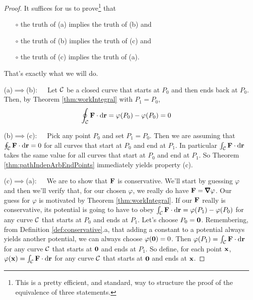 \begin{proof}
It suffices for us to prove\footnote{This is a pretty efficient, and 
standard, way to structure the proof of the equivalence of three 
statements.} that 
\begin{itemize}\itemsep1pt \parskip0pt  %
\item[$\circ$]
the truth of (a) implies the truth of (b) and
\item[$\circ$]
the truth of (b) implies the truth of (c) and
\item[$\circ$]
the truth of (c) implies the truth of (a).
\end{itemize}
That's exactly what we will do.

\noindent (a)$\implies$(b):\ \ \ 
Let $\mathcal{C}$ be a closed curve that starts at $P_0$ and then ends back at $P_0$.
Then, by Theorem \ref{thm:workIntegral} with $P_1=P_0$,
\begin{equation*}
\oint_{\mathcal{C}}\mathbf{F}\cdot\mathrm{d}\mathbf{r} =\varphi(P_0) - \varphi(P_0)=0
\end{equation*}

\noindent (b)$\implies$(c):\ \ \ 
Pick any point $P_0$ and set $P_1=P_0$. Then we are assuming that
$\oint_{\mathcal{C}}\mathbf{F}\cdot\mathrm{d}\mathbf{r}=0$ for all curves that start at $P_0$ and end at $P_1$.
In particular  $\int_{\mathcal{C}}\mathbf{F}\cdot\mathrm{d}\mathbf{r}$ takes the same value for all curves
that start at $P_0$ and end at $P_1$.
So Theorem \ref{thm:pathIndepArbEndPoints} immediately yields
property (c).

\medskip
\noindent (c)$\implies$(a):\ \ \ We are to show that $\mathbf{F}$ is conservative.
We'll start by guessing $\varphi$ and then we'll verify that, for our
chosen $\varphi$, we really do have $\vF=\vnabla\varphi$. Our guess for 
$\varphi$ is motivated by Theorem \ref{thm:workIntegral}. If our $\mathbf{F}$ really is conservative, its potential is going to have to obey
$\int_{\mathcal{C}}\mathbf{F}\cdot\mathrm{d}\mathbf{r} =\varphi(P_1) - \varphi(P_0)$ for any curve $\mathcal{C}$ that starts at $P_0$ and ends at $P_1$. Let's choose $P_0=\mathbf{0}$. Remembering,
from Definition \ref{def:conservative}.a, that adding a constant to a 
potential always yields another potential, we can always choose 
$\varphi(\mathbf{0})=0$. Then $\varphi(P_1)=\int_{\mathcal{C}}\mathbf{F}\cdot\mathrm{d}\mathbf{r}$ for any 
curve $\mathcal{C}$ that starts at $\mathbf{0}$ and ends at $P_1$. So define,
for each point $\mathbf{x}$, $\varphi(\mathbf{x})=\int_{\mathcal{C}}\mathbf{F}\cdot\mathrm{d}\mathbf{r}$ for any 
curve $\mathcal{C}$ that starts at $\mathbf{0}$ and ends at $\mathbf{x}$.


\end{proof}
